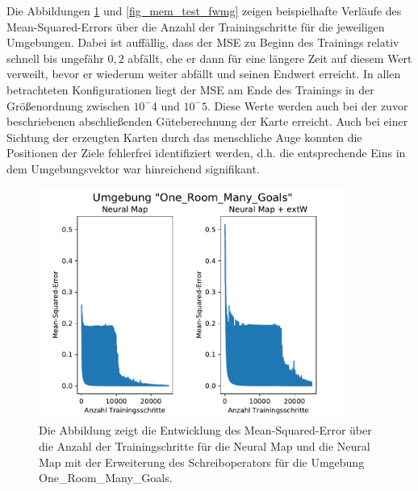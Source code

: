 Die Abbildungen \ref{fig_mem_test_ormg} und \ref{fig_mem_test_fwmg} zeigen beispielhafte Verläufe des Mean-Squared-Errors über die Anzahl der Trainingschritte für die jeweiligen Umgebungen. Dabei ist auffällig, dass der MSE zu Beginn des Trainings relativ schnell bis ungefähr $0,2$ abfällt, ehe er dann für eine längere Zeit auf diesem Wert verweilt, bevor er wiederum weiter abfällt und seinen Endwert erreicht. In allen betrachteten Konfigurationen liegt der MSE am Ende des Trainings in der Größenordnung zwischen $10^-4$ und $10^-5$. Diese Werte werden auch bei der zuvor beschriebenen abschließenden Güteberechnung der Karte erreicht. Auch bei einer Sichtung der erzeugten Karten durch das menschliche Auge konnten die Positionen der Ziele fehlerfrei identifiziert werden, d.h. die entsprechende Eins in dem Umgebungsvektor war hinreichend signifikant.


\begin{figure}[ht!]
  \centering
  \includegraphics[height=0.575\textwidth, width=0.9\textwidth]{abbildungen/mem_test_ormg.pdf}
  \caption{Die Abbildung zeigt die Entwicklung des Mean-Squared-Error über die Anzahl der Trainingschritte für die Neural Map und die Neural Map mit der Erweiterung des Schreiboperators für die Umgebung \glqq One\_Room\_Many\_Goals\grqq{}.}
  \label{fig_mem_test_ormg}
\end{figure}

